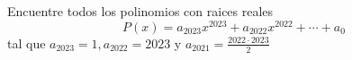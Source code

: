 \begin{problem}
    Encuentre todos los polinomios con raices reales
    \[P(x)=a_{2023}x^{2023}+a_{2022}x^{2022}+\cdots+a_0 \]
    tal que $a_{2023}=1,a_{2022}=2023$ y $a_{2021}=\frac{2022\cdot 2023}{2}$

    \label{24MEXIBEROTSTB1}
\end{problem}
